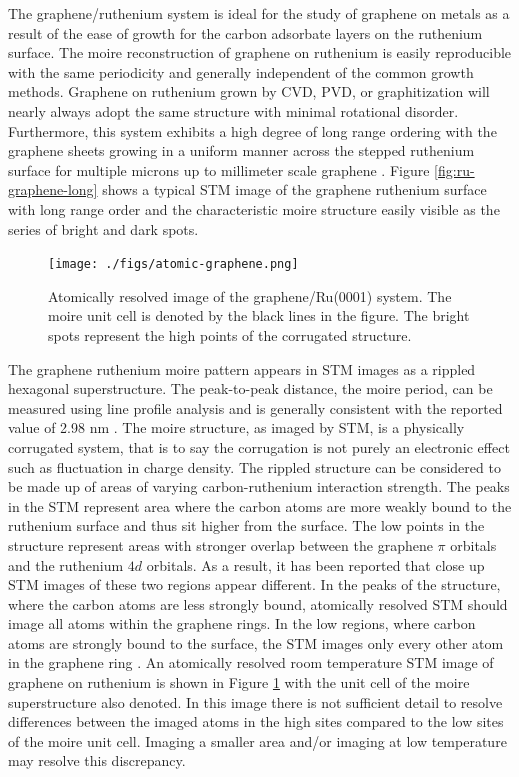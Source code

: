 The graphene/ruthenium system is ideal for the study of graphene on metals as a result of the ease of growth for the carbon adsorbate layers on the ruthenium surface. The moire reconstruction of graphene on ruthenium is easily reproducible with the same periodicity and generally independent of the common growth methods. Graphene on ruthenium grown by CVD, PVD, or graphitization will nearly always adopt the same structure with minimal rotational disorder. Furthermore, this system exhibits a high degree of long range ordering with the graphene sheets growing in a uniform manner across the stepped ruthenium surface for multiple microns up to millimeter scale graphene \cite{ mm-graphene}. Figure \ref{fig:ru-graphene-long} shows a typical STM image of the graphene ruthenium surface with long range order and the characteristic moire structure easily visible as the series of bright and dark spots.

\begin{figure}
  \centering
  \texttt{[image: ./figs/atomic-graphene.png]}
  \caption{
  Atomically resolved image of the graphene/Ru(0001) system. The moire unit cell is denoted by the black lines in the figure. The bright spots represent the high points of the corrugated structure.
  }
  \label{fig:atomic-graphene}
\end{figure}


The graphene ruthenium moire pattern appears in STM images as a rippled hexagonal superstructure. The peak-to-peak distance, the moire period, can be measured using line profile analysis and is generally consistent with the reported value of 2.98 nm \cite{march}. The moire structure, as imaged by STM, is a physically corrugated system, that is to say the corrugation is not purely an electronic effect such as fluctuation in charge density. The rippled structure can be considered to be made up of areas of varying carbon-ruthenium interaction strength. The peaks in the STM represent area where the carbon atoms are more weakly bound to the ruthenium surface and thus sit higher from the surface. The low points in the structure represent areas with stronger overlap between the graphene $\pi$ orbitals and the ruthenium $4d$ orbitals. As a result, it has been reported that close up STM images of these two regions appear different. In the peaks of the structure, where the carbon atoms are less strongly bound, atomically resolved STM should image all atoms within the graphene rings. In the low regions, where carbon atoms are strongly bound to the surface, the STM images only every other atom in the graphene ring \cite{march}. An atomically resolved room temperature STM image of graphene on ruthenium is shown in Figure \ref{fig:atomic-graphene} with the unit cell of the moire superstructure also denoted. In this image there is not sufficient detail to resolve differences between the imaged atoms in the high sites compared to the low sites of the moire unit cell. Imaging a smaller area and/or imaging at low temperature may resolve this discrepancy.

